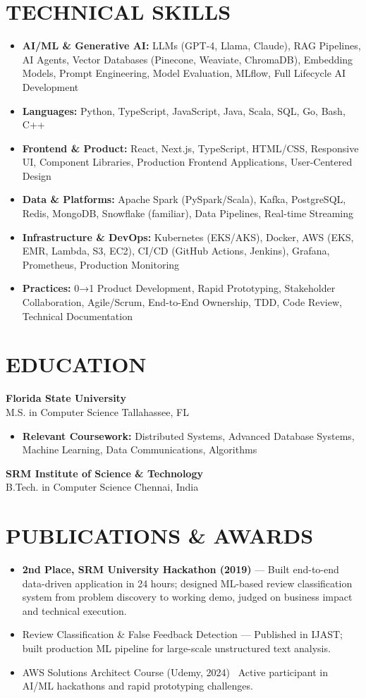 \documentclass[letterpaper,10pt]{article}
\newcommand{\resumeItem}[1]{\item\small #1}
\newcommand{\resumeSubheading}[4]{
  \vspace{6pt}
  \noindent
  \textbf{#1} \hfill {\footnotesize #2} \\
  [-1pt]
  \noindent
  \small #3 \hfill {\small #4}
  \vspace{3pt}
}
\newcommand{\resumeItemsStart}{\vspace{-2pt}\begin{itemize}}
\newcommand{\resumeItemsEnd}{\end{itemize}\vspace{6pt}}
\begin{document}
\section{\textcolor{metablue}{TECHNICAL SKILLS}}
\vspace{-5pt}
\small
\begin{itemize}
\resumeItem{\textbf{AI/ML \& Generative AI:} LLMs (GPT-4, Llama, Claude), RAG Pipelines, AI Agents, Vector Databases (Pinecone, Weaviate, ChromaDB), Embedding Models, Prompt Engineering, Model Evaluation, MLflow, Full Lifecycle AI Development}
\resumeItem{\textbf{Languages:} Python, TypeScript, JavaScript, Java, Scala, SQL, Go, Bash, C++}
\resumeItem{\textbf{Frontend \& Product:} React, Next.js, TypeScript, HTML/CSS, Responsive UI, Component Libraries, Production Frontend Applications, User-Centered Design}
\resumeItem{\textbf{Data \& Platforms:} Apache Spark (PySpark/Scala), Kafka, PostgreSQL, Redis, MongoDB, Snowflake (familiar), Data Pipelines, Real-time Streaming}
\resumeItem{\textbf{Infrastructure \& DevOps:} Kubernetes (EKS/AKS), Docker, AWS (EKS, EMR, Lambda, S3, EC2), CI/CD (GitHub Actions, Jenkins), Grafana, Prometheus, Production Monitoring}
\resumeItem{\textbf{Practices:} 0→1 Product Development, Rapid Prototyping, Stakeholder Collaboration, Agile/Scrum, End-to-End Ownership, TDD, Code Review, Technical Documentation}
\end{itemize}
\vspace{-10pt}


\section{\textcolor{metablue}{EDUCATION}}
\vspace{-10pt}
\resumeSubheading
{Florida State University}{}
{M.S. in Computer Science}{Tallahassee, FL}
\resumeItemsStart
\resumeItem{\textbf{Relevant Coursework:} Distributed Systems, Advanced Database Systems, Machine Learning, Data Communications, Algorithms}
\resumeItemsEnd
\vspace{-5pt}
\resumeSubheading
{SRM Institute of Science \& Technology}{}
{B.Tech. in Computer Science}{Chennai, India}
\vspace{-10pt}

\section{\textcolor{metablue}{PUBLICATIONS \& AWARDS}}
\vspace{-5pt}
\begin{itemize}
\resumeItem{\textbf{2nd Place, SRM University Hackathon (2019)} --- Built end-to-end data-driven application in 24 hours; designed ML-based review classification system from problem discovery to working demo, judged on business impact and technical execution.}
\resumeItem{Review Classification \& False Feedback Detection --- Published in IJAST; built production ML pipeline for large-scale unstructured text analysis.}
\resumeItem{AWS Solutions Architect Course (Udemy, 2024) \textbar\ Active participant in AI/ML hackathons and rapid prototyping challenges.}
\end{itemize}
\end{document}
